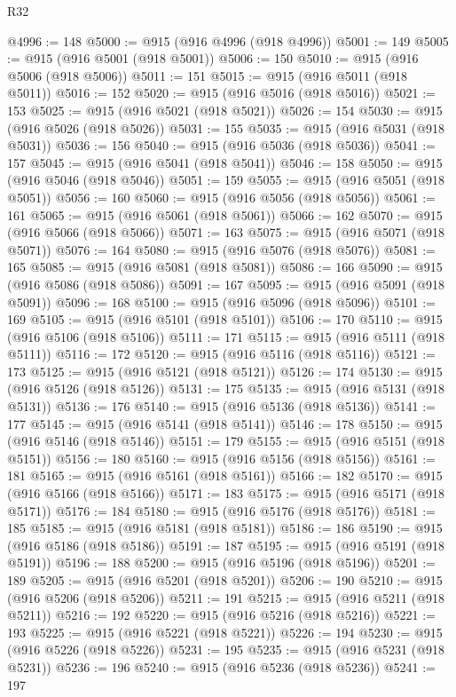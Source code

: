 \begin{lexlean}{R32}
\begin{coremodule}
@4996 := 148
@5000 := @915 (@916 @4996 (@918 @4996))
@5001 := 149
@5005 := @915 (@916 @5001 (@918 @5001))
@5006 := 150
@5010 := @915 (@916 @5006 (@918 @5006))
@5011 := 151
@5015 := @915 (@916 @5011 (@918 @5011))
@5016 := 152
@5020 := @915 (@916 @5016 (@918 @5016))
@5021 := 153
@5025 := @915 (@916 @5021 (@918 @5021))
@5026 := 154
@5030 := @915 (@916 @5026 (@918 @5026))
@5031 := 155
@5035 := @915 (@916 @5031 (@918 @5031))
@5036 := 156
@5040 := @915 (@916 @5036 (@918 @5036))
@5041 := 157
@5045 := @915 (@916 @5041 (@918 @5041))
@5046 := 158
@5050 := @915 (@916 @5046 (@918 @5046))
@5051 := 159
@5055 := @915 (@916 @5051 (@918 @5051))
@5056 := 160
@5060 := @915 (@916 @5056 (@918 @5056))
@5061 := 161
@5065 := @915 (@916 @5061 (@918 @5061))
@5066 := 162
@5070 := @915 (@916 @5066 (@918 @5066))
@5071 := 163
@5075 := @915 (@916 @5071 (@918 @5071))
@5076 := 164
@5080 := @915 (@916 @5076 (@918 @5076))
@5081 := 165
@5085 := @915 (@916 @5081 (@918 @5081))
@5086 := 166
@5090 := @915 (@916 @5086 (@918 @5086))
@5091 := 167
@5095 := @915 (@916 @5091 (@918 @5091))
@5096 := 168
@5100 := @915 (@916 @5096 (@918 @5096))
@5101 := 169
@5105 := @915 (@916 @5101 (@918 @5101))
@5106 := 170
@5110 := @915 (@916 @5106 (@918 @5106))
@5111 := 171
@5115 := @915 (@916 @5111 (@918 @5111))
@5116 := 172
@5120 := @915 (@916 @5116 (@918 @5116))
@5121 := 173
@5125 := @915 (@916 @5121 (@918 @5121))
@5126 := 174
@5130 := @915 (@916 @5126 (@918 @5126))
@5131 := 175
@5135 := @915 (@916 @5131 (@918 @5131))
@5136 := 176
@5140 := @915 (@916 @5136 (@918 @5136))
@5141 := 177
@5145 := @915 (@916 @5141 (@918 @5141))
@5146 := 178
@5150 := @915 (@916 @5146 (@918 @5146))
@5151 := 179
@5155 := @915 (@916 @5151 (@918 @5151))
@5156 := 180
@5160 := @915 (@916 @5156 (@918 @5156))
@5161 := 181
@5165 := @915 (@916 @5161 (@918 @5161))
@5166 := 182
@5170 := @915 (@916 @5166 (@918 @5166))
@5171 := 183
@5175 := @915 (@916 @5171 (@918 @5171))
@5176 := 184
@5180 := @915 (@916 @5176 (@918 @5176))
@5181 := 185
@5185 := @915 (@916 @5181 (@918 @5181))
@5186 := 186
@5190 := @915 (@916 @5186 (@918 @5186))
@5191 := 187
@5195 := @915 (@916 @5191 (@918 @5191))
@5196 := 188
@5200 := @915 (@916 @5196 (@918 @5196))
@5201 := 189
@5205 := @915 (@916 @5201 (@918 @5201))
@5206 := 190
@5210 := @915 (@916 @5206 (@918 @5206))
@5211 := 191
@5215 := @915 (@916 @5211 (@918 @5211))
@5216 := 192
@5220 := @915 (@916 @5216 (@918 @5216))
@5221 := 193
@5225 := @915 (@916 @5221 (@918 @5221))
@5226 := 194
@5230 := @915 (@916 @5226 (@918 @5226))
@5231 := 195
@5235 := @915 (@916 @5231 (@918 @5231))
@5236 := 196
@5240 := @915 (@916 @5236 (@918 @5236))
@5241 := 197

\end{coremodule}
\end{lexlean}
